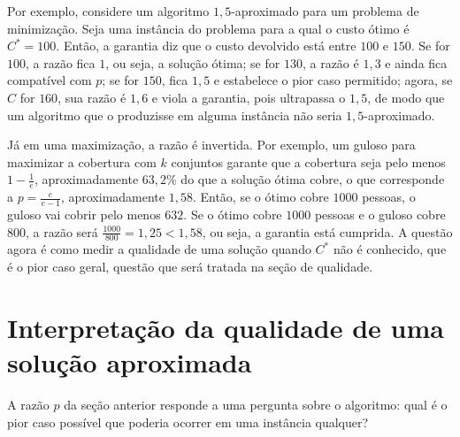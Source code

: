 Por exemplo, considere um algoritmo $1{,}5$-aproximado para um problema de minimização. Seja uma instância do problema para a qual o custo ótimo é $C^* = 100$. Então, a garantia diz que o custo devolvido está entre $100$ e $150$. Se for $100$, a razão fica $1$, ou seja, a solução ótima; se for $130$, a razão é $1{,}3$ e ainda fica compatível com $p$; se for $150$, fica $1{,}5$ e estabelece o pior caso permitido; agora, se $C$ for $160$, sua razão é $1{,}6$ e viola a garantia, pois ultrapassa o $1{,}5$, de modo que um algoritmo que o produzisse em alguma instância não seria $1{,}5$-aproximado.

Já em uma maximização, a razão é invertida. Por exemplo, um guloso para maximizar a cobertura com $k$ conjuntos garante que a cobertura seja pelo menos $1 - \frac{1}{e}$, aproximadamente $63{,}2\%$ do que a solução ótima cobre, o que corresponde a $p = \frac{e}{e - 1}$, aproximadamente $1{,}58$. Então, se o ótimo cobre $1000$ pessoas, o guloso vai cobrir pelo menos $632$. Se o ótimo cobre $1000$ pessoas e o guloso cobre $800$, a razão será $\frac{1000}{800} = 1{,}25 < 1{,}58$, ou seja, a garantia está cumprida. A questão agora é como medir a qualidade de uma solução quando $C^*$ não é conhecido, que é o pior caso geral, questão que será tratada na seção de qualidade.

\section{Interpretação da qualidade de uma solução aproximada}
\label{sec:qualidade}

A razão $p$ da seção anterior responde a uma pergunta sobre o algoritmo: qual é o pior caso possível que poderia ocorrer em uma instância qualquer?

